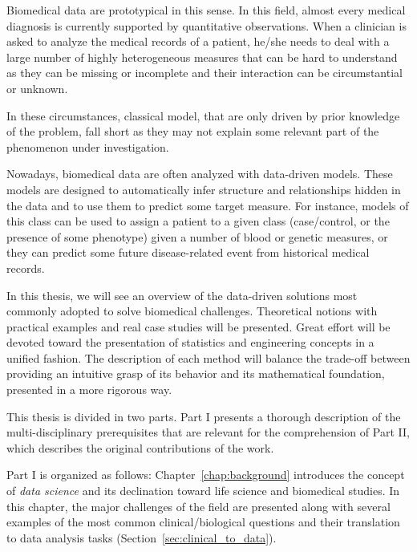 Biomedical data are prototypical in this sense. In this field, almost every medical diagnosis is currently supported by quantitative observations.
When a clinician is asked to analyze the medical records of a patient, he/she needs to deal with a large number of highly heterogeneous measures that can be hard to understand as they can be missing or incomplete and their interaction can be circumstantial or unknown.

In these circumstances, classical model, that are only driven by prior knowledge of the problem, fall short as they may not explain some relevant part of the phenomenon under investigation.

Nowadays, biomedical data are often analyzed with data-driven models. These models are designed to automatically infer structure and relationships hidden in the data and to use them to predict some target measure. For instance, models of this class can be used to assign a patient to a given class (\eg case/control, or the presence of some phenotype) given a number of blood or genetic measures, or they can predict some future disease-related event from historical medical records.

In this thesis, we will see an overview of the data-driven solutions most commonly adopted to solve biomedical challenges. Theoretical notions with practical examples and real case studies will be presented. Great effort will be devoted toward the presentation of statistics and engineering concepts in a unified fashion. The description of each method will balance the trade-off between providing an intuitive grasp of its behavior and its mathematical foundation, presented in a more rigorous way.

This thesis is divided in two parts. Part I presents a thorough description of the multi-disciplinary prerequisites that are relevant for the comprehension of Part II, which describes the original contributions of the work.

Part I is organized as follows: Chapter~\ref{chap:background} introduces the concept of \textit{data science} and its declination toward life science and biomedical studies. In this chapter, the major challenges of the field are presented along with several examples of the most common clinical/biological questions and their translation to data analysis tasks (Section~\ref{sec:clinical_to_data}).

